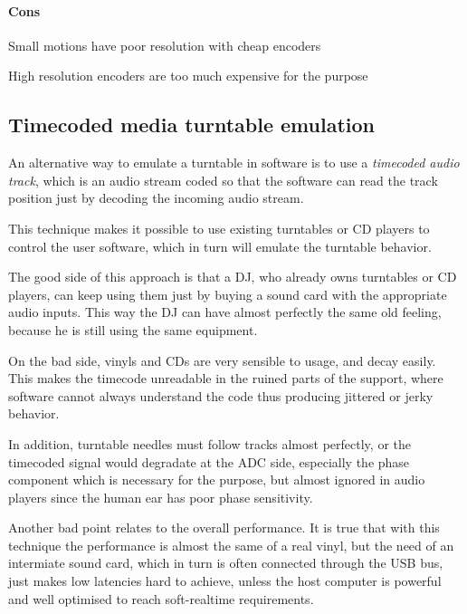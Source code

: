\documentclass[a4paper,10pt]{article}
\begin{document}
\begin{multicols}{2}
\paragraph{Cons}
\begin{itemize*}
	\item Small motions have poor resolution with cheap encoders
	\item High resolution encoders are too much expensive for the purpose
\end{itemize*}


\subsection{Timecoded media turntable emulation}

An alternative way to emulate a turntable in software is to use a
\emph{timecoded audio track}, which is an audio stream coded so that the
software can read the track position just by decoding the incoming audio
stream.

This technique makes it possible to use existing turntables or CD players to
control the user software, which in turn will emulate the turntable behavior.

The good side of this approach is that a DJ, who already owns turntables or CD
players, can keep using them just by buying a sound card with the appropriate
audio inputs. This way the DJ can have almost perfectly the same old feeling,
because he is still using the same equipment.

On the bad side, vinyls and CDs are very sensible to usage, and decay easily.
This makes the timecode unreadable in the ruined parts of the support, where
software cannot always understand the code thus producing jittered or jerky
behavior.

In addition, turntable needles must follow tracks almost perfectly, or the
timecoded signal would degradate at the ADC side, especially the phase
component which is necessary for the purpose, but almost ignored in audio
players since the human ear has poor phase sensitivity.

Another bad point relates to the overall performance. It is true that with
this technique the performance is almost the same of a real vinyl, but the
need of an intermiate sound card, which in turn is often connected through the
USB bus, just makes low latencies hard to achieve, unless the host computer is
powerful and well optimised to reach soft-realtime requirements.


\end{multicols}
\end{document}
